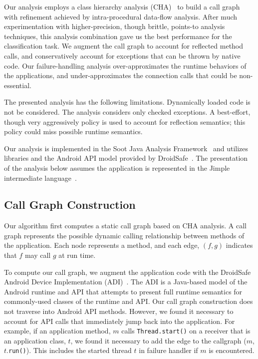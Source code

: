 Our analysis employs a class hierarchy analysis (CHA)~\cite{Dean1995}
to build a call graph with refinement achieved by intra-procedural
data-flow analysis.  After much experimentation with higher-precision,
though brittle, points-to analysis techniques, this analysis
combination gave us the best performance for the classification task.
We augment the call graph to account for reflected method calls, and
conservatively account for exceptions that can be thrown by native
code.  Our failure-handling analysis over-approximates the runtime
behaviors of the applications, and under-approximates the connection
calls that could be non-essential.

The presented analysis has the following limitations. Dynamically
loaded code is not be considered.  The analysis considers only checked
exceptions.  A best-effort, though very aggressively policy is used to
account for reflection semantics; this policy could miss possible
runtime semantics.

Our analysis is implemented in the Soot Java Analysis
Framework~\cite{Vallee-Rai2000} and utilizes libraries and the Android
API model provided by
DroidSafe~\cite{Gordon:Kim:Perkins:Gilham:Nguyen:Rinard:NDSS15}. The
presentation of the analysis below assumes the application is
represented in the Jimple intermediate language~\cite{Vallee-Rai2000}.

\subsection{Call Graph Construction}

Our algorithm first computes a static call graph based on CHA
analysis.  A call graph represents the possible dynamic calling
relationship between methods of the application.  Each node represents
a method, and each edge, $(f,g)$ indicates that $f$ may call $g$ at
run time.

To compute our call graph, we augment the application code with the
DroidSafe Android Device Implementation
(ADI)~\cite{Gordon:Kim:Perkins:Gilham:Nguyen:Rinard:NDSS15}.  The ADI
is a Java-based model of the Android runtime and API that attempts to
present full runtime semantics for commonly-used classes of the
runtime and API.  Our call graph construction does not traverse into
Android API methods.  However, we found it necessary to account for
API calls that immediately jump back into the application.  For
example, if an application method, $m$ calls
\lstinline!Thread.start()! on a receiver that is an application class,
$t$, we found it necessary to add the edge to the callgraph ($m$,
$t$.\lstinline!run()!).  This includes the started thread $t$ in
failure handler if $m$ is encountered.

